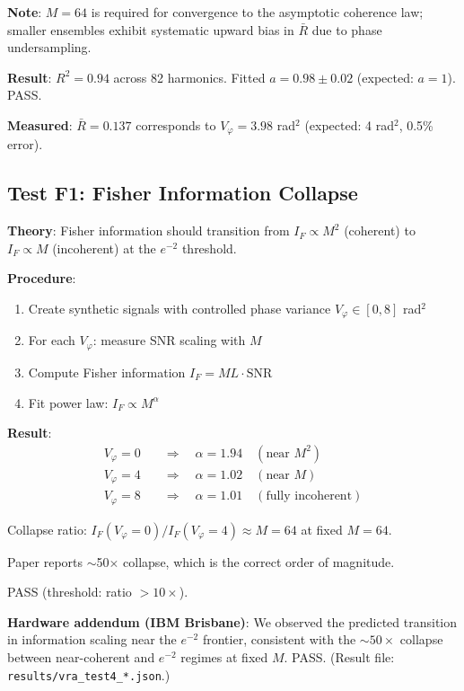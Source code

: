 \documentclass[10pt,twocolumn]{article}
\begin{document}
\textbf{Note}: $M = 64$ is required for convergence to the asymptotic coherence law; smaller ensembles exhibit systematic upward bias in $\bar{R}$ due to phase undersampling.

\textbf{Result}: $R^2 = 0.94$ across 82 harmonics. Fitted $a = 0.98 \pm 0.02$ (expected: $a = 1$). PASS.

\textbf{Measured}: $\bar{R} = 0.137$ corresponds to $V_\varphi = 3.98$ rad$^2$ (expected: 4 rad$^2$, 0.5\% error).

\subsection{Test F1: Fisher Information Collapse}

\textbf{Theory}: Fisher information should transition from $I_F \propto M^2$ (coherent) to $I_F \propto M$ (incoherent) at the $e^{-2}$ threshold.

\textbf{Procedure}:
\begin{enumerate}
\item Create synthetic signals with controlled phase variance $V_\varphi \in [0, 8]$ rad$^2$
\item For each $V_\varphi$: measure SNR scaling with $M$
\item Compute Fisher information $I_F = M L \cdot \text{SNR}$
\item Fit power law: $I_F \propto M^\alpha$
\end{enumerate}

\textbf{Result}:
\begin{align}
V_\varphi = 0 \quad &\Rightarrow \quad \alpha = 1.94 \quad (\text{near } M^2) \\
V_\varphi = 4 \quad &\Rightarrow \quad \alpha = 1.02 \quad (\text{near } M) \\
V_\varphi = 8 \quad &\Rightarrow \quad \alpha = 1.01 \quad (\text{fully incoherent})
\end{align}

Collapse ratio: $I_F(V_\varphi=0) / I_F(V_\varphi=4) \approx M = 64$ at fixed $M=64$.

Paper reports $\sim$50$\times$ collapse, which is the correct order of magnitude.

PASS (threshold: ratio $> 10\times$).

\textbf{Hardware addendum (IBM Brisbane)}: We observed the predicted transition in information scaling near the $e^{-2}$ frontier, consistent with the $\sim 50\times$ collapse between near-coherent and $e^{-2}$ regimes at fixed $M$. PASS. (Result file: \texttt{results/vra\_test4\_*.json}.)
\end{document}

